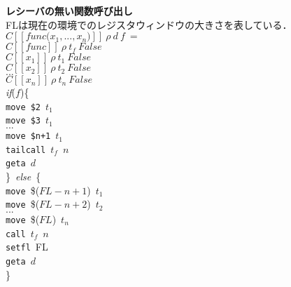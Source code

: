 \documentclass[a4j,12pt]{jarticle}
\begin{document}
{\begin{tabbing}
\textbf{レシーバの無い関数呼び出し} \\
FLは現在の環境でのレジスタウィンドウの大きさを表している． \\
\>$C[[func\texttt{(}x_1, ... , x_n\texttt{)}]]\ \rho\ d\ f\ =$ \\
\>\>$C[[func]]\ \rho\ t_f\ False$ \\
\>\>$C[[x_1]]\ \rho\ t_1\ False$ \\
\>\>$C[[x_2]]\ \rho\ t_2\ False$ \\
\>\>$...$ \\
\>\>$C[[x_n]]\ \rho\ t_n\ False$ \\
\>\>\textit{if}($f$)\{ \\
\>\>\>\texttt{move}\ \texttt{\$2}\ $t_1$ \\
\>\>\>\texttt{move}\ \texttt{\$3}\ $t_1$ \\
\>\>\>$...$ \\
\>\>\>\texttt{move}\ \texttt{\$n+1}\ $t_1$ \\
\>\>\>\texttt{tailcall}\ $t_f$\ $n$ \\
\>\>\>\texttt{geta}\ $d$ \\
\>\>\}\ \textit{else}\ \{ \\
\>\>\>\texttt{move}\ \$($FL-n+1$)\ $t_1$ \\
\>\>\>\texttt{move}\ \$($FL-n+2$)\ $t_2$ \\
\>\>\>$...$ \\
\>\>\>\texttt{move}\ \$($FL$)\ $t_n$ \\
\>\>\>\texttt{call}\ $t_f$\ $n$ \\
\>\>\>\texttt{setfl}\ FL \\
\>\>\>\texttt{geta}\ $d$ \\
\>\>\} \\
\\


\end{tabbing}}
\end{document}
